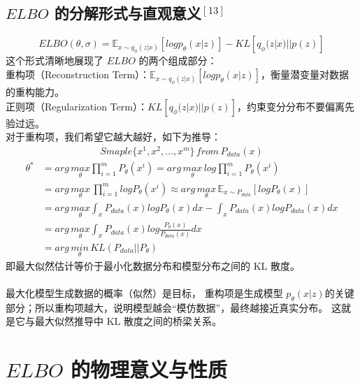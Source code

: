 \documentclass[final]{ws-ijseke}
\begin{document}
\subsection{$ELBO$ 的分解形式与直观意义$^{[13]}$}
\begin{equation*}
ELBO(\theta,\sigma)= \mathbb{E}_{x\sim q_\phi(z|x)}[logp_\theta(x|z)] - KL[q_\phi(z|x)||p(z)]
\end{equation*}
\hspace*{2em} 这个形式清晰地展现了 $ELBO$ 的两个组成部分：\\
重构项（Reconstruction Term）：$\mathbb{E}_{x\sim q_\phi(z|x)}[logp_\theta(x|z)]$，衡量潜变量对数据的重构能力。\\
正则项（Regularization Term）：$KL[q_\phi(z|x)||p(z)]$，约束变分分布不要偏离先验过远。\\
对于重构项，我们希望它越大越好，如下为推导：
\begin{align*}
    Smaple\{x^1,x^2,\dots,x^m\}\, from \, P_{data}(x)
\end{align*}
\begin{align*}
    \theta^* &= arg \,\underset{\theta}{max}\prod_{i=1}^mP_\theta(x^i)= arg \,\underset{\theta}{max}\, log\prod_{i=1}^mP_\theta(x^i) \\&=
    arg \,\underset{\theta}{max}\, \prod_{i=1}^mlogP_\theta(x^i) \approx arg \,\underset{\theta}{max}\, \mathbb{E}_{x \sim P_{data}}[logP_\theta(x)] \\& = arg\, \underset{\theta}{max} \int_xP_{data}(x)logP_\theta(x)dx - \int_xP_{data}(x)logP_{data}(x)dx\\&= arg\, \underset{\theta}{max} \int_xP_{data}(x)log\frac{P_\theta(x)}{P_{data}(x)}dx \\& = arg\,\underset{\theta}{min} \,KL(P_{data}||P_\theta)
\end{align*}
即最大似然估计等价于最小化数据分布和模型分布之间的 KL 散度。\\\\
\hspace*{2em} 最大化模型生成数据的概率（似然）是目标，
重构项是生成模型 $p_\theta(x|z)$的关键部分；所以重构项越大，说明模型越会“模仿数据”，最终越接近真实分布。
这就是它与最大似然推导中 KL 散度之间的桥梁关系。

\section{$ELBO$ 的物理意义与性质}
\end{document}
